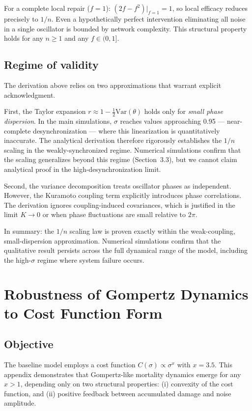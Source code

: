 \documentclass[12pt]{article}
\begin{document}
For a complete local repair ($f = 1$): $(2f - f^2)|_{f=1} = 1$, so local
efficacy reduces precisely to $1/n$. Even a hypothetically perfect intervention
eliminating all noise in a single oscillator is bounded by network complexity.
This structural property holds for any $n \geq 1$ and any $f \in (0,1]$.

\subsection{Regime of validity}

The derivation above relies on two approximations that warrant explicit
acknowledgment.

First, the Taylor expansion $r \approx 1 - \frac{1}{2}\mathrm{Var}(\theta)$
holds only for \emph{small phase dispersion}. In the main simulations, $\sigma$
reaches values approaching 0.95 — near-complete desynchronization — where this
linearization is quantitatively inaccurate. The analytical derivation therefore
rigorously establishes the $1/n$ scaling in the weakly-synchronized regime.
Numerical simulations confirm that the scaling generalizes beyond this regime
(Section~3.3), but we cannot claim analytical proof in the high-desynchronization
limit.

Second, the variance decomposition treats oscillator phases as independent.
However, the Kuramoto coupling term explicitly introduces phase correlations.
The derivation ignores coupling-induced covariances, which is justified in the
limit $K \to 0$ or when phase fluctuations are small relative to $2\pi$.

In summary: the $1/n$ scaling law is proven exactly within the weak-coupling,
small-dispersion approximation. Numerical simulations confirm that the
qualitative result persists across the full dynamical range of the model,
including the high-$\sigma$ regime where system failure occurs.

\section{Robustness of Gompertz Dynamics to Cost Function Form}
\label{app:gompertz}

\subsection{Objective}

The baseline model employs a cost function $C(\sigma) \propto \sigma^x$ with
$x = 3.5$. This appendix demonstrates that Gompertz-like mortality dynamics
emerge for any $x > 1$, depending only on two structural properties: (i)
convexity of the cost function, and (ii) positive feedback between accumulated
damage and noise amplitude.
\end{document}

